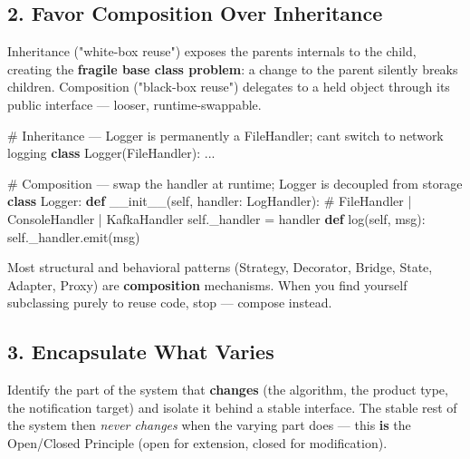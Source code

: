 \documentclass[11pt]{article}
\newenvironment{Shaded}{\begin{snugshade}}{\end{snugshade}}
\newcommand{\CommentTok}[1]{\textcolor[rgb]{0.48,0.49,0.49}{#1}}
\newcommand{\FunctionTok}[1]{\textcolor[rgb]{0.56,0.27,0.68}{#1}}
\newcommand{\KeywordTok}[1]{\textcolor[rgb]{0.81,0.81,0.76}{\textbf{#1}}}
\newcommand{\NormalTok}[1]{\textcolor[rgb]{0.81,0.81,0.76}{#1}}
\newcommand{\OperatorTok}[1]{\textcolor[rgb]{0.81,0.81,0.76}{#1}}
\newcommand{\VariableTok}[1]{\textcolor[rgb]{0.15,0.68,0.68}{#1}}
\begin{document}
\subsection{2. Favor Composition Over Inheritance}\label{2-favor-composition-over-inheritance}

Inheritance ("white-box reuse") exposes the parent\textquotesingle s internals to the child, creating the \textbf{fragile base class problem}: a change to the parent silently breaks children. Composition ("black-box reuse") delegates to a held object through its public interface --- looser, runtime-swappable.


\begin{Shaded}
\begin{Highlighting}[]
\CommentTok{\# Inheritance — Logger is permanently a FileHandler; can\textquotesingle{}t switch to network logging}
\KeywordTok{class}\NormalTok{ Logger(FileHandler): ...}

\CommentTok{\# Composition — swap the handler at runtime; Logger is decoupled from storage}
\KeywordTok{class}\NormalTok{ Logger:}
    \KeywordTok{def} \FunctionTok{\_\_init\_\_}\NormalTok{(}\VariableTok{self}\NormalTok{, handler: LogHandler):  }\CommentTok{\# FileHandler | ConsoleHandler | KafkaHandler}
        \VariableTok{self}\NormalTok{.\_handler }\OperatorTok{=}\NormalTok{ handler}
    \KeywordTok{def}\NormalTok{ log(}\VariableTok{self}\NormalTok{, msg): }\VariableTok{self}\NormalTok{.\_handler.emit(msg)}
\end{Highlighting}
\end{Shaded}

Most structural and behavioral patterns (Strategy, Decorator, Bridge, State, Adapter, Proxy) are \textbf{composition} mechanisms. When you find yourself subclassing purely to reuse code, stop --- compose instead.

\subsection{3. Encapsulate What Varies}\label{3-encapsulate-what-varies}

Identify the part of the system that \textbf{changes} (the algorithm, the product type, the notification target) and isolate it behind a stable interface. The stable rest of the system then \emph{never changes} when the varying part does --- this \textbf{is} the Open/Closed Principle (open for extension, closed for modification).
\end{document}
